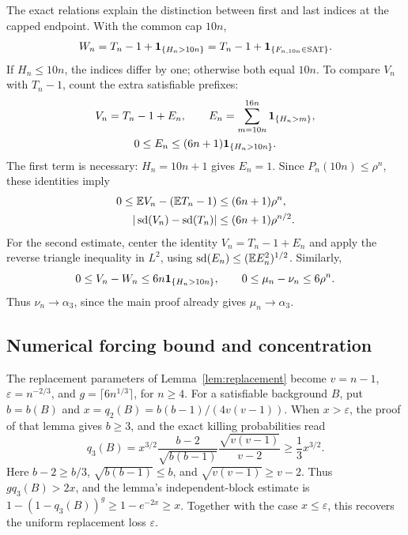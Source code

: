 The exact relations explain the distinction between first and last
indices at the capped endpoint. With the common cap \(10n\),
\begin{equation}\label{eq:three-same-cap}
 W_n=T_n-1+\mathbf 1_{\{H_n>10n\}}
     =T_n-1+\mathbf 1_{\{F_{n,10n}\in\mathrm{SAT}\}}.
\end{equation}
If \(H_n\le10n\), the indices differ by one; otherwise both equal
\(10n\). To compare \(V_n\) with \(T_n-1\), count the extra satisfiable
prefixes:
\begin{equation}\label{eq:three-cross-cap}
\begin{gathered}
 V_n=T_n-1+E_n,\qquad
 E_n=\sum_{m=10n}^{16n}\mathbf 1_{\{H_n>m\}},\\
 0\le E_n\le(6n+1)\mathbf 1_{\{H_n>10n\}}.
\end{gathered}
\end{equation}
The first term is necessary: \(H_n=10n+1\) gives \(E_n=1\).
Since \(P_n(10n)\le\rho^n\), these identities imply
\begin{align}
 0\le\mathbb E V_n-(\mathbb E T_n-1)&\le(6n+1)\rho^n,
       \label{eq:three-mean-bridge}\\
 |\operatorname{sd}(V_n)-\operatorname{sd}(T_n)|&\le(6n+1)\rho^{n/2}.
       \label{eq:three-sd-bridge}
\end{align}
For the second estimate, center the identity \(V_n=T_n-1+E_n\) and
apply the reverse triangle inequality in \(L^2\), using
\(\operatorname{sd}(E_n)\le(\mathbb E E_n^2)^{1/2}\). Similarly,
\begin{equation}\label{eq:three-last-cap-bridge}
 0\le V_n-W_n\le6n\mathbf 1_{\{H_n>10n\}},\qquad
 0\le\mu_n-\nu_n\le6\rho^n.
\end{equation}
Thus \(\nu_n\to\alpha_3\), since the main proof already gives
\(\mu_n\to\alpha_3\).

\subsection{Numerical forcing bound and concentration}

The replacement parameters of Lemma~\ref{lem:replacement} become
\(v=n-1\), \(\varepsilon=n^{-2/3}\), and
\(g=\lceil6n^{1/3}\rceil\), for \(n\ge4\).
For a satisfiable background \(B\), put \(b=b(B)\) and
\(x=q_2(B)=b(b-1)/(4v(v-1))\). When \(x>\varepsilon\), the proof of
that lemma gives \(b\ge3\), and the exact killing probabilities read
\begin{equation}\label{eq:three-killing}
 q_3(B)=x^{3/2}
 \frac{b-2}{\sqrt{b(b-1)}}
 \frac{\sqrt{v(v-1)}}{v-2}
 \ge\frac13x^{3/2}.
\end{equation}
Here \(b-2\ge b/3\), \(\sqrt{b(b-1)}\le b\), and
\(\sqrt{v(v-1)}\ge v-2\). Thus \(gq_3(B)>2x\), and the lemma's
independent-block estimate is
\(1-(1-q_3(B))^g\ge1-e^{-2x}\ge x\).
Together with the case \(x\le\varepsilon\), this recovers the uniform
replacement loss \(\varepsilon\).

